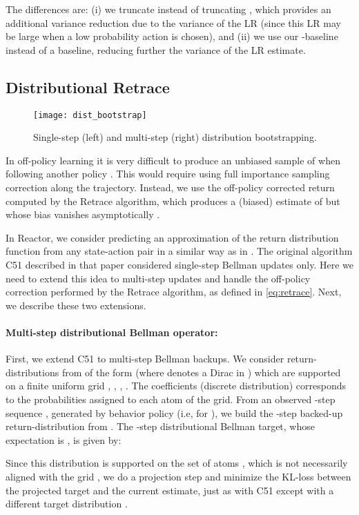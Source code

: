 \documentclass{article}
\begin{document}
The differences are: (i) we truncate  
instead of truncating , which provides an additional variance 
reduction due to the variance of the LR 
 (since this LR may be large when 
a low probability action is chosen), and (ii) we use our -baseline instead 
of a  baseline, reducing further the variance of the LR estimate.


\subsection{Distributional Retrace}\label{sec:dist_retrace}
\begin{figure}
\centering
\texttt{[image: dist\_bootstrap]}
  \caption{Single-step (left) and multi-step (right) distribution bootstrapping.}
  \label{distributions-multi-step}
\end{figure}
In off-policy learning it is very difficult to produce an 
unbiased sample  of  when following another policy . 
This would require using full importance sampling correction along the 
trajectory.  Instead, we use the off-policy corrected return computed 
by the Retrace algorithm, which produces a (biased) estimate of  
but whose bias vanishes asymptotically \citep{munos2016safe}.

In Reactor, we consider predicting an 
approximation of the return distribution function from any state-action pair 
 in a similar way as in \citet{bellemare2017distributional}. The 
original 
algorithm C51 described in that paper considered single-step Bellman updates 
only. Here we need to extend this idea to multi-step updates 
and handle the off-policy correction performed by the Retrace algorithm, as 
defined in
\eqref{eq:retrace}. Next, we describe these two extensions.

\paragraph{Multi-step distributional Bellman operator:} First, we extend C51 to 
multi-step Bellman backups. We consider return-distributions from  of the form 
 (where  denotes a Dirac in ) 
which are supported on a finite uniform grid , , , . 
The coefficients  (discrete distribution) corresponds to the 
probabilities assigned to each atom 
 of the grid. From an observed -step sequence , generated by behavior policy  
(i.e,  for ), we build the 
-step backed-up return-distribution from . The -step distributional 
Bellman target, whose expectation is , 
is given by:

Since this distribution is supported on the set of atoms , which is 
not necessarily aligned with the grid 
, we do a projection step and minimize the KL-loss between the projected 
target and the current estimate, just as with C51 except with a different target distribution \citep{bellemare2017distributional}.
\end{document}

